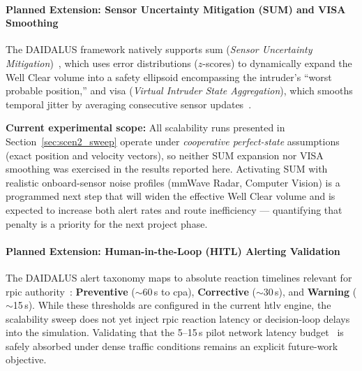 \paragraph{Planned Extension: Sensor Uncertainty Mitigation (SUM) and VISA Smoothing}
\label{sec:sum_visa_future}
The DAIDALUS framework natively supports \gls{sum}
(\emph{Sensor Uncertainty Mitigation})~\cite{applying_sum_nasa}, which uses error
distributions ($z$-scores) to dynamically expand the Well Clear volume into a safety
ellipsoid encompassing the intruder's ``worst probable position,'' and \gls{visa}
(\emph{Virtual Intruder State Aggregation}), which smooths temporal jitter by averaging
consecutive sensor updates~\cite{sum_evaluation_nasa}.

\textbf{Current experimental scope:} All scalability runs presented in
Section~\ref{sec:scen2_sweep} operate under \emph{cooperative perfect-state} assumptions
(exact position and velocity vectors), so neither SUM expansion nor VISA smoothing was
exercised in the results reported here. Activating SUM with realistic onboard-sensor noise
profiles (mmWave Radar, Computer Vision) is a programmed next step that will widen the
effective Well Clear volume and is expected to increase both alert rates and route
inefficiency --- quantifying that penalty is a priority for the next project phase.

\paragraph{Planned Extension: Human-in-the-Loop (HITL) Alerting Validation}
The DAIDALUS alert taxonomy maps to absolute reaction timelines relevant for \gls{rpic}
authority~\cite{atc_acceptability_nasa}: \textbf{Preventive} ($\sim$60\,s to \gls{cpa}),
\textbf{Corrective} ($\sim$30\,s), and \textbf{Warning} ($\sim$15\,s). While these thresholds
are configured in the current \gls{htlv} engine, the scalability sweep does not yet inject
\gls{rpic} reaction latency or decision-loop delays into the simulation. Validating that the
5--15\,s pilot network latency budget~\cite{atc_acceptability_nasa} is safely absorbed under
dense traffic conditions remains an explicit future-work objective.

